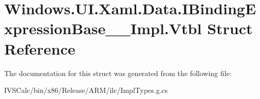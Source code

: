 \hypertarget{struct_windows_1_1_u_i_1_1_xaml_1_1_data_1_1_i_binding_expression_base_____impl_1_1_vtbl}{}\section{Windows.\+U\+I.\+Xaml.\+Data.\+I\+Binding\+Expression\+Base\+\_\+\+\_\+\+Impl.\+Vtbl Struct Reference}
\label{struct_windows_1_1_u_i_1_1_xaml_1_1_data_1_1_i_binding_expression_base_____impl_1_1_vtbl}


The documentation for this struct was generated from the following file\+:\begin{DoxyCompactItemize}
\item 
I\+V\+S\+Calc/bin/x86/\+Release/\+A\+R\+M/ilc/Impl\+Types.\+g.\+cs\end{DoxyCompactItemize}
